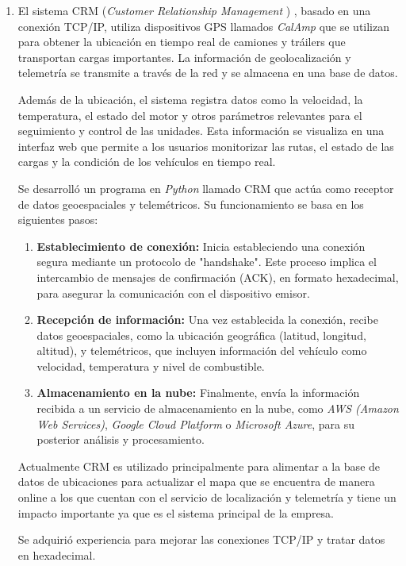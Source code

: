 \documentclass[protocolo.tex]{subfiles}
\begin{document}
\begin{enumerate}
\item El sistema CRM (\textit{Customer Relationship Management })   , basado en una conexión TCP/IP, utiliza dispositivos GPS llamados \textit{CalAmp} que se utilizan para obtener la ubicación en tiempo real de camiones y tráilers que transportan cargas importantes. La información de geolocalización y telemetría se transmite a través de la red y se almacena en una base de datos.

Además de la ubicación, el sistema registra datos como la velocidad, la temperatura, el estado del motor y otros parámetros relevantes para el seguimiento y control de las unidades. Esta información se visualiza en una interfaz web que permite a los usuarios monitorizar las rutas, el estado de las cargas y la condición de los vehículos en tiempo real.

Se desarrolló un programa en \textit{Python} llamado CRM que actúa como receptor de datos geoespaciales y telemétricos. Su funcionamiento se basa en los siguientes pasos:
\begin{enumerate}
    \item \textbf{Establecimiento de conexión:}  Inicia estableciendo una conexión segura mediante un protocolo de "handshake". Este proceso implica el intercambio de mensajes de confirmación (ACK), en formato hexadecimal, para asegurar la comunicación con el dispositivo emisor.
    \item \textbf{Recepción de información:} Una vez establecida la conexión,  recibe datos geoespaciales, como la ubicación geográfica (latitud, longitud, altitud), y telemétricos, que incluyen información del vehículo como velocidad, temperatura y nivel de combustible.
    \item \textbf{Almacenamiento en la nube:} Finalmente, envía la información recibida a un servicio de almacenamiento en la nube, como  \textit{AWS (Amazon Web Services)}, \textit{Google Cloud Platform} o \textit{Microsoft Azure}, para su posterior análisis y procesamiento.
\end{enumerate}


Actualmente CRM es utilizado principalmente para alimentar a la base de datos de
ubicaciones para actualizar el mapa que se encuentra de manera online a los que cuentan
con el servicio de localización y telemetría y tiene un impacto importante ya que es el
sistema principal de la empresa.


Se adquirió experiencia para mejorar las conexiones TCP/IP y tratar datos en hexadecimal.



\end{enumerate}
\end{document}
